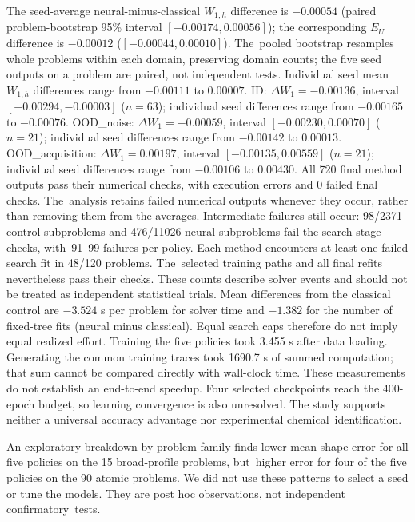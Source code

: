 \documentclass[mathematics,article,accept,moreauthors]{Definitions/mdpi}
\begin{document}
The seed-average neural-minus-classical $W_{1,h}$ difference is $-0.00054$ (paired problem-bootstrap 95\% interval $[-0.00174, 0.00056]$); the corresponding $E_U$ difference is $-0.00012$ ($[-0.00044, 0.00010]$). The~pooled bootstrap resamples whole problems within each domain, preserving domain counts; the five seed outputs on a problem are paired, not independent tests. Individual seed mean $W_{1,h}$ differences range from $-0.00111$ to $0.00007$.
ID: $\Delta W_1=-0.00136$, interval $[-0.00294, -0.00003]$ ($n=63$); individual seed differences range from $-0.00165$ to $-0.00076$. OOD\_noise: $\Delta W_1=-0.00059$, interval $[-0.00230, 0.00070]$ ($n=21$); individual seed differences range from $-0.00142$ to $0.00013$. OOD\_acquisition: $\Delta W_1=0.00197$, interval $[-0.00135, 0.00559]$ ($n=21$); individual seed differences range from $-0.00106$ to $0.00430$.
All 720 final method outputs pass their numerical checks, with execution errors
and 0 failed final checks. The~analysis retains failed numerical outputs whenever
they occur, rather than removing them from the averages.
Intermediate failures still occur: 98/2371 control subproblems and 476/11026 neural
subproblems fail the search-stage checks, with~91--99 failures per policy. Each
method encounters at least one failed search fit in 48/120 problems. The~selected
training paths and all final refits nevertheless pass their checks. These counts
describe solver events and should not be treated as independent statistical trials.
Mean differences from the classical control are $-3.524$ s per problem
for solver time and $-1.382$ for the number of fixed-tree fits (neural minus
classical). Equal search caps therefore do not imply equal realized effort.
Training the five policies took 3.455 s after data loading. Generating the common training traces took 1690.7 s of summed computation; that sum cannot be compared directly with wall-clock time.
These measurements do not establish an end-to-end speedup. Four selected
checkpoints reach the 400-epoch budget, so learning convergence is also unresolved.
The study supports neither a universal accuracy advantage nor experimental
chemical~identification.

An exploratory breakdown by problem family finds lower mean shape error for
all five policies on the 15 broad-profile problems, but~higher error for four
of the five policies on the 90 atomic problems. We did not use these patterns
to select a seed or tune the models. They are post hoc observations, not
independent confirmatory~tests.
\end{document}
